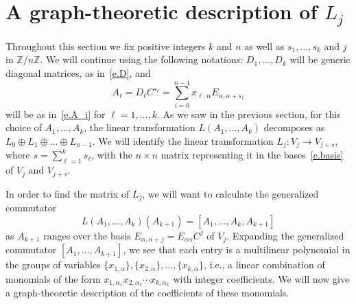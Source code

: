 \documentclass{amsproc}
\theoremstyle{definition}
\theoremstyle{remark}
\numberwithin{equation}{section}
\newcommand{\Z}{{\mathbb Z}}
\begin{document}
\section{A graph-theoretic description of $L_j$}
\label{overall_strategy}


Throughout this section we fix positive integers $k$ and $n$ as well as 
$s_1,\dots,s_k$ and $j$ in $\Z/n\Z$. We will continue using the following notations:
$D_1, \ldots, D_k$ will be generic diagonal matrices, as in~\eqref{e.D}, and
\[A_\ell= D_{\ell} C^{s_{\ell}} = \sum_{i=0}^{n-1}x_{\ell, \alpha}E_{\alpha, \alpha+s_\ell}\]
will be as in~\eqref{e.A_i} for $\ell = 1, \ldots, k$. 
As we saw in the previous section, for this choice of $A_1, \ldots, A_k$, 
the linear transformation $L(A_1, \dots, A_k)$ decomposes as $L_0 \oplus L_1 \oplus \ldots \oplus L_{n-1}$.
We will identify the linear transformation $L_j \colon V_j\rightarrow V_{j+s}$, where $s=\sum_{\ell=1}^k s_{\ell}$, 
with the $n \times n$ matrix representing it in the bases~\eqref{e.basis} of $V_j$ and $V_{j+s}$.

In order to find the matrix of $L_j$, we will want to calculate the generalized commutator 
\[ L(A_1, \ldots, A_k)(A_{k+1}) = [A_1,\dots,A_k, A_{k+1}] \]
as $A_{k+1}$ ranges over the basis $E_{\alpha, \alpha + j} = E_{\alpha \alpha} C^j$ of $V_j$. Expanding the generalized commutator $[A_1, \ldots, A_{k+1}]$, 
we see that each entry is a multilinear polynomial in the groups of variables $\{ x_{1, \alpha} \}, \{ x_{2, \alpha} \}, \ldots, \{ x_{k, \alpha} \}$, i.e.,
a linear combination of monomials of the form
$x_{1,\alpha_1}x_{2,\alpha_2}\cdots x_{k,\alpha_{k}}$ with integer coefficients. 
We will now give a graph-theoretic description of the coefficients of these monomials.
\end{document}
